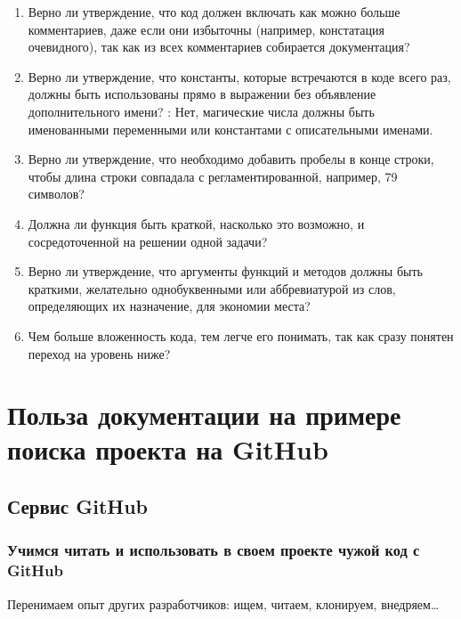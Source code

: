 \documentclass[letterpaper,10pt,russian]{sphinxmanual}
\begin{document}
\begin{enumerate}
\item {} 
\sphinxAtStartPar
Верно ли утверждение, что код должен включать как можно больше комментариев, даже если они избыточны (например, констатация очевидного), так как из всех комментариев собирается документация?

\item {} 
\sphinxAtStartPar
Верно ли утверждение, что константы, которые встречаются в коде всего раз, должны быть использованы прямо в выражении без объявление дополнительного имени? : Нет, магические числа должны быть именованными переменными или константами с описательными именами.

\item {} 
\sphinxAtStartPar
Верно ли утверждение, что необходимо добавить пробелы в конце строки, чтобы длина строки совпадала с регламентированной, например, 79 символов?

\item {} 
\sphinxAtStartPar
Должна ли функция быть краткой, насколько это возможно, и сосредоточенной на решении одной задачи?

\item {} 
\sphinxAtStartPar
Верно ли утверждение, что аргументы функций и методов должны быть краткими, желательно однобуквенными или аббревиатурой из слов, определяющих их назначение, для экономии места?

\item {} 
\sphinxAtStartPar
Чем больше вложенность кода, тем легче его понимать, так как сразу понятен переход на уровень ниже?

\end{enumerate}


\chapter{Польза документации на примере поиска проекта на GitHub}
\label{\detokenize{index:id6}}
\sphinxstepscope


\section{Сервис GitHub}
\label{\detokenize{educational_materials/github/content:github}}\label{\detokenize{educational_materials/github/content::doc}}

\subsection{Учимся читать и использовать в своем проекте чужой код с GitHub}
\label{\detokenize{educational_materials/github/content:id1}}
\sphinxAtStartPar
Перенимаем опыт других разработчиков: ищем, читаем, клонируем, внедряем…
\end{document}
